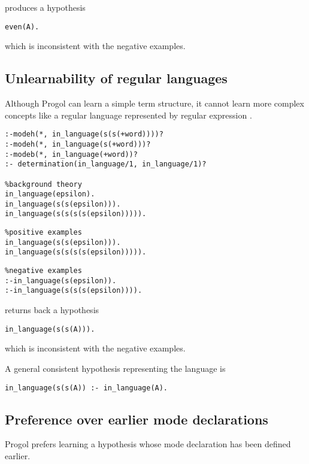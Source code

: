 produces a hypothesis
\begin{lstlisting}
even(A).
\end{lstlisting}
which is inconsistent with the negative examples.

\subsection{Unlearnability of regular languages}
Although Progol can learn a simple term structure, it cannot learn more complex concepts like a regular language represented by regular expression .

\begin{lstlisting}
:-modeh(*, in_language(s(s(+word))))?
:-modeh(*, in_language(s(+word)))?
:-modeb(*, in_language(+word))?
:- determination(in_language/1, in_language/1)?

%background theory
in_language(epsilon).
in_language(s(s(epsilon))).
in_language(s(s(s(s(epsilon))))).
\end{lstlisting}

\begin{minipage}[t]{.50\textwidth}
\begin{lstlisting}
%positive examples
in_language(s(s(epsilon))).
in_language(s(s(s(s(epsilon))))).
\end{lstlisting}
\end{minipage}
\begin{minipage}[t]{.20\textwidth}
\begin{lstlisting}
%negative examples
:-in_language(s(epsilon)).
:-in_language(s(s(s(epsilon)))).
\end{lstlisting}
\end{minipage}

returns back a hypothesis
\begin{lstlisting}
in_language(s(s(A))).
\end{lstlisting}
which is inconsistent with the negative examples.

A general consistent hypothesis representing the language is
\begin{lstlisting}
in_language(s(s(A)) :- in_language(A).
\end{lstlisting}

\subsection{Preference over earlier mode declarations}
Progol prefers learning a hypothesis whose mode declaration has been defined earlier.

